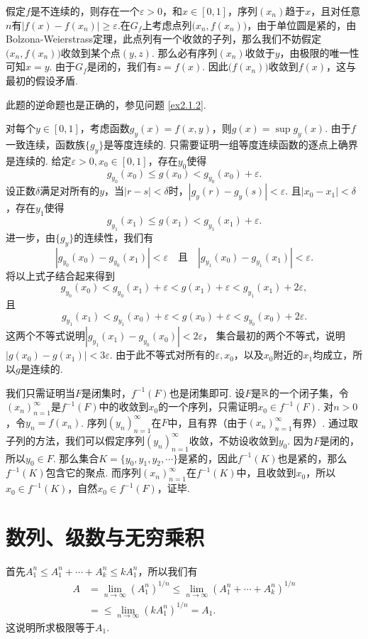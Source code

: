 \begin{ans}
  假定$f$是不连续的，则存在一个$\varepsilon>0$，和$x\in[0,1]$，序列$(x_n)$趋于$x$，且对任意$n$有$|f(x)-f(x_n)|\ge\varepsilon$.在$G_f$上考虑点列$\big(x_n,f(x_n)\big)$，由于单位圆是紧的，由Bolzona-Weierstrass定理，此点列有一个收敛的子列，那么我们不妨假定$\big(x_n,f(x_n)\big)$收敛到某个点$(y,z)$. 那么必有序列$(x_n)$收敛于$y$，由极限的唯一性可知$x=y$. 由于$G_f$是闭的，我们有$z=f(x)$. 因此$\big(f(x_n)\big)$收敛到$f(x)$，这与最初的假设矛盾.

  此题的逆命题也是正确的，参见问题 \ref{ex2.1.2}.
\end{ans}

\begin{ans}
  对每个$y\in[0,1]$，考虑函数$g_y(x)=f(x,y)$，则$g(x)=\sup g_y(x)$. 由于$f$一致连续，函数族$\{g_y\}$是等度连续的. 只需要证明一组等度连续函数的逐点上确界是连续的. 给定$\varepsilon>0,x_0\in[0,1]$，存在$y_0$使得
  \[ g_{y_0}(x_0)\le g(x_0) < g_{y_0}(x_0)+\varepsilon. \]
  设正数$\delta$满足对所有的$y$，当$|r-s|<\delta$时，$|g_y(r)-g_y(s)|<\varepsilon$. 且$|x_0-x_1|<\delta$，存在$y_1$使得
  \[ g_{y_1}(x_1)\le g(x_1)<g_{y_1}(x_1)+\varepsilon. \]
  进一步，由$\{g_y\}$的连续性，我们有
  \[ |g_{y_0}(x_0)-g_{y_0}(x_1)|<\varepsilon
  \quad\text{且}\quad
  |g_{y_1}(x_0)-g_{y_1}(x_1)| <\varepsilon. \]
  将以上式子结合起来得到
  \[ g_{y_0}(x_0)<g_{y_0}(x_1)+\varepsilon <
  g(x_1)+\varepsilon <g_{y_1}(x_1)+2\varepsilon, \]
  且
  \[ g_{y_1}(x_1)<g_{y_1}(x_0)+\varepsilon <
  g(x_0)+\varepsilon <g_{y_0}(x_0)+2\varepsilon. \]
  这两个不等式说明$|g_{y_1}(x_1)-g_{y_0}(x_0)|<2\varepsilon$，
  集合最初的两个不等式，说明$|g(x_0)-g(x_1)|<3\varepsilon$. 由于此不等式对所有的$\varepsilon,x_0$，以及$x_0$附近的$x_1$均成立，所以$g$是连续的.
\end{ans}

\begin{ans}
  我们只需证明当$F$是闭集时，$f^{-1}(F)$也是闭集即可. 设$F$是$\mathbb R$的一个闭子集，令$(x_n)_{n=1}^\infty$是$f^{-1}(F)$中的收敛到$x_0$的一个序列，只需证明$x_0\in f^{-1}(F)$. 对$n>0$，令$y_n=f(x_n)$. 序列$(y_n)_{n=1}^\infty$在$F$中，且有界（由于$(x_n)_{n=1}^\infty$有界）. 通过取子列的方法，我们可以假定序列$(y_n)_{n=1}^\infty$收敛，不妨设收敛到$y_0$. 因为$F$是闭的，所以$y_0\in F$. 那么集合$K=\{y_0,y_1,y_2,\cdots\}$是紧的，因此$f^{-1}(K)$也是紧的，那么$f^{-1}(K)$包含它的聚点. 而序列$(x_n)_{n=1}^\infty$在$f^{-1}(K)$中，且收敛到$x_0$，所以$x_0\in f^{-1}(K)$，自然$x_0\in f^{-1}(F)$，证毕.
\end{ans}

\section{数列、级数与无穷乘积}
\begin{ans}
  首先$A_1^n\le A_1^n+\cdots+A_k^n\le kA_1^n$，所以我们有
  \begin{align*}
    A & = \lim_{n\to\infty} (A_1^n)^{1/n} \le
    \lim_{n\to\infty}(A_1^n+\cdots+A_k^n)^{1/n}\\
      & = \le \lim_{n\to\infty}(kA_1^n)^{1/n} = A_1.
  \end{align*}
  这说明所求极限等于$A_1$.
\end{ans}

